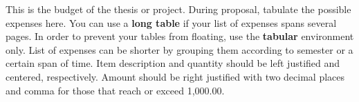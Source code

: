 This is the budget of the thesis or project.
During proposal, tabulate the possible expenses here.
You can use a \textbf{long table} if your list of expenses spans several pages.
In order to prevent your tables from floating, use the \textbf{tabular} environment only.
List of expenses can be shorter by grouping them according to semester or a certain span of time.
Item description and quantity should be left justified and centered, respectively.
Amount should be right justified with two decimal places and comma for those that reach or exceed 1,000.00.
